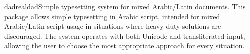 \documentclass{ddltxtyp}
\begin{document}

\begin{package}{dadreal}{dad}{Simple typesetting system for mixed Arabic/Latin documents.}
This package allows simple typesetting in Arabic script,
intended for mixed Arabic/Latin script usage in situations
where heavy-duty solutions are discouraged. The  system
operates with both Unicode and transliterated input, allowing
the user to choose the most appropriate approach for every
situation.
\end{package}


\end{document}
